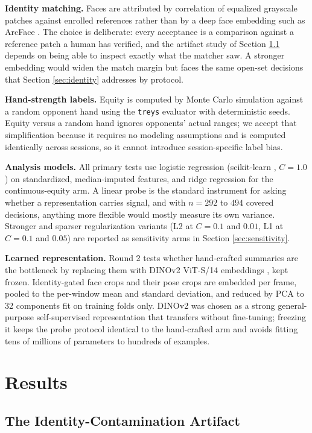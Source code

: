 \documentclass[conference]{IEEEtran}
\begin{document}
\textbf{Identity matching.} Faces are attributed by correlation of
equalized grayscale patches against enrolled references rather than by a
deep face embedding such as ArcFace \cite{deng2019arcface}. The choice
is deliberate: every acceptance is a comparison against a reference
patch a human has verified, and the artifact study of Section
\ref{sec:artifact} depends on being able to inspect exactly what the
matcher saw. A stronger embedding would widen the match margin but faces
the same open-set decisions that Section \ref{sec:identity} addresses by
protocol.

\textbf{Hand-strength labels.} Equity is computed by Monte Carlo
simulation against a random opponent hand using the \texttt{treys}
evaluator with deterministic seeds. Equity versus a random hand ignores
opponents' actual ranges; we accept that simplification because it
requires no modeling assumptions and is computed identically across
sessions, so it cannot introduce session-specific label bias.

\textbf{Analysis models.} All primary tests use logistic regression
(scikit-learn \cite{pedregosa2011scikit}, $C=1.0$) on standardized,
median-imputed features, and ridge regression for the continuous-equity
arm. A linear probe is the standard instrument for asking whether a
representation carries signal, and with $n=292$ to $494$ covered
decisions, anything more flexible would mostly measure its own variance.
Stronger and sparser regularization variants (L2 at $C=0.1$ and $0.01$,
L1 at $C=0.1$ and $0.05$) are reported as sensitivity arms in Section
\ref{sec:sensitivity}.

\textbf{Learned representation.} Round 2 tests whether hand-crafted
summaries are the bottleneck by replacing them with DINOv2 ViT-S/14
embeddings \cite{oquab2024dinov2}, kept frozen. Identity-gated face
crops and their pose crops are embedded per frame, pooled to the
per-window mean and standard deviation, and reduced by PCA to 32
components fit on training folds only. DINOv2 was chosen as a strong
general-purpose self-supervised representation that transfers without
fine-tuning; freezing it keeps the probe protocol identical to the
hand-crafted arm and avoids fitting tens of millions of parameters to
hundreds of examples.

\section{Results}

\subsection{The Identity-Contamination Artifact}
\label{sec:artifact}
\end{document}
